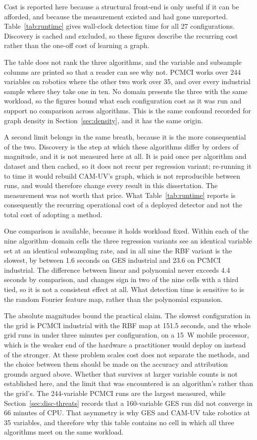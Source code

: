 Cost is reported here because a structural front-end is only useful if it can be afforded, and because the measurement existed and had gone unreported. Table~\ref{tab:runtime} gives wall-clock detection time for all 27 configurations. Discovery is cached and excluded, so these figures describe the recurring cost rather than the one-off cost of learning a graph.

The table does not rank the three algorithms, and the variable and subsample columns are printed so that a reader can see why not. PCMCI works over 244 variables on robotics where the other two work over 35, and over every industrial sample where they take one in ten. No domain presents the three with the same workload, so the figures bound what each configuration cost as it was run and support no comparison across algorithms. This is the same confound recorded for graph density in Section~\ref{sec:density}, and it has the same origin.

A second limit belongs in the same breath, because it is the more consequential of the two. Discovery is the step at which these algorithms differ by orders of magnitude, and it is not measured here at all. It is paid once per algorithm and dataset and then cached, so it does not recur per regression variant; re-running it to time it would rebuild CAM-UV's graph, which is not reproducible between runs, and would therefore change every result in this dissertation. The measurement was not worth that price. What Table~\ref{tab:runtime} reports is consequently the recurring operational cost of a deployed detector and not the total cost of adopting a method.

One comparison is available, because it holds workload fixed. Within each of the nine algorithm--domain cells the three regression variants see an identical variable set at an identical subsampling rate, and in all nine the RBF variant is the slowest, by between 1.6 seconds on GES industrial and 23.6 on PCMCI industrial. The difference between linear and polynomial never exceeds 4.4 seconds by comparison, and changes sign in two of the nine cells with a third tied, so it is not a consistent effect at all. What detection time is sensitive to is the random Fourier feature map, rather than the polynomial expansion.

The absolute magnitudes bound the practical claim. The slowest configuration in the grid is PCMCI industrial with the RBF map at 151.5 seconds, and the whole grid runs in under three minutes per configuration, on a 15~W mobile processor, which is the weaker end of the hardware a practitioner would deploy on instead of the stronger. At these problem scales cost does not separate the methods, and the choice between them should be made on the accuracy and attribution grounds argued above. Whether that survives at larger variable counts is not established here, and the limit that was encountered is an algorithm's rather than the grid's. The 244-variable PCMCI runs are the largest measured, while Section~\ref{sec:disc-threats} records that a 160-variable GES run did not converge in 66 minutes of CPU. That asymmetry is why GES and CAM-UV take robotics at 35 variables, and therefore why this table contains no cell in which all three algorithms meet on the same workload.



